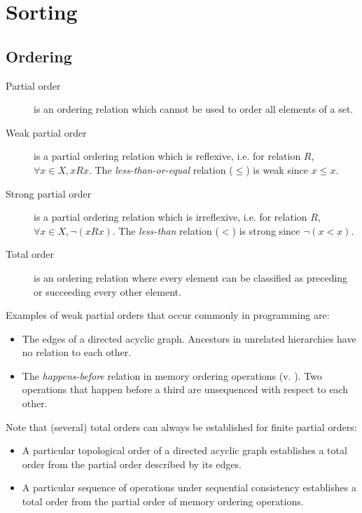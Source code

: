 \section{Sorting}

\subsection{Ordering}
\label{subsec:algo:ordering}

\begin{description}
    \item[Partial order]
        is an ordering relation which cannot be used to order all elements of a
        set.
    \item[Weak partial order]
        is a partial ordering relation which is reflexive, i.e. for relation
        $R$, $\forall x \in X, x R x$.  The \textit{less-than-or-equal} relation
        ($\leq$) is weak since $x \leq x$.
    \item[Strong partial order]
        is a partial ordering relation which is irreflexive, i.e. for relation
        $R$, $\forall x \in X, \neg(x R x)$.  The \textit{less-than} relation
        ($<$) is strong since $\neg(x < x)$.
    \item[Total order]
        is an ordering relation where every element can be classified as
        preceding or succeeding every other element.
\end{description}

\begin{aside}
    Examples of weak partial orders that occur commonly in programming are:
    \begin{itemize}
        \item
            The edges of a directed acyclic graph.  Ancestors in unrelated
            hierarchies have no relation to each other.
        \item
            The \textit{happens-before} relation in memory ordering operations
            (v.  ).  Two operations that happen
            before a third are unsequenced with respect to each other.
    \end{itemize}
\end{aside}

Note that (several) total orders can always be established for finite partial
orders:

\begin{itemize}
    \item
        A particular topological order of a directed acyclic graph establishes a
        total order from the partial order described by its edges.
    \item
        A particular sequence of operations under sequential consistency
        establishes a total order from the partial order of memory ordering
        operations.
\end{itemize}

